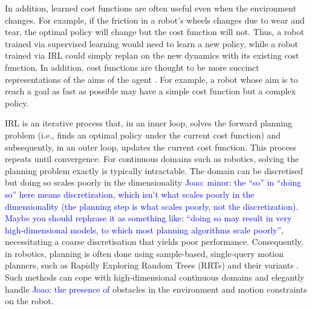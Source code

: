 \documentclass[letterpaper, 10 pt, conference]{ieeeconf}
\newcommand{\jm}[1]{\textcolor{blue}{Joao: #1}}
\begin{document}
In addition, learned cost functions are often useful even when the environment changes.  For example, if the friction in a robot's wheels changes due to wear and tear, the optimal policy will change but the cost function will not. Thus, a robot trained via supervised learning would need to learn a new policy, while a robot trained via IRL could simply replan on the new dynamics with its existing cost function. In addition, cost functions are thought to be more succinct representations of the aims of the agent \cite{abbeel2004apprenticeship}. For example, a robot whose aim is to reach a goal as fast as possible may have a simple cost function but a complex policy. 

IRL is an iterative process that, in an inner loop, solves the forward planning problem (i.e., finds an optimal policy under the current cost function) and subsequently, in an outer loop, updates the current cost function. This process repeats until convergence. For continuous domains such as robotics, solving the planning problem exactly is typically intractable. The domain can be discretised but doing so scales poorly in the dimensionality \jm{minor: the ``so'' in ``doing so'' here means discretization, which isn't what scales poorly in the dimensionality (the planning step is what scales poorly, not the discretization). Maybe you should rephrase it as something like: ``doing so may result in very high-dimensional models, to which most planning algorithms scale poorly''}, necessitating a coarse discretisation that yields poor performance.  Consequently, in robotics, planning is often done using sample-based, single-query motion planners, such as Rapidly Exploring Random Trees (RRTs) \cite{lavalle1998rapidly} and their variants \cite{karaman2011sampling}. Such methods can cope with high-dimensional continuous domains and elegantly handle \jm{the presence of} obstacles in the environment and motion constraints on the robot.


\end{document}
